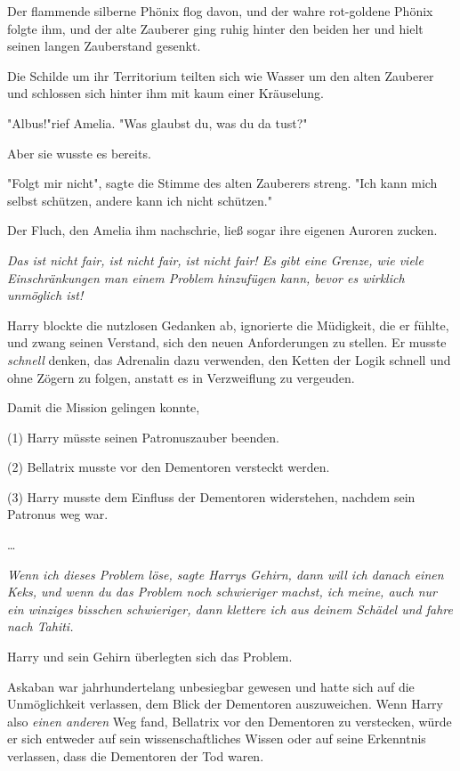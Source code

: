 {Der flammende silberne Phönix flog davon, und der wahre rot-goldene Phönix folgte ihm, und der alte Zauberer ging ruhig hinter den beiden her und hielt seinen langen Zauberstand gesenkt.

Die Schilde um ihr Territorium teilten sich wie Wasser um den alten Zauberer und schlossen sich hinter ihm mit kaum einer Kräuselung.

"Albus!"rief Amelia. "Was glaubst du, was du da tust?"

Aber sie wusste es bereits.

"Folgt mir nicht", sagte die Stimme des alten Zauberers streng. "Ich kann mich selbst schützen, andere kann ich nicht schützen."

Der Fluch, den Amelia ihm nachschrie, ließ sogar ihre eigenen Auroren zucken.

\emph{\emph{Das ist nicht fair, ist nicht fair, ist nicht fair! Es gibt eine Grenze, wie viele Einschränkungen man einem Problem hinzufügen kann, bevor es wirklich unmöglich ist!}}

Harry blockte die nutzlosen Gedanken ab, ignorierte die Müdigkeit, die er fühlte, und zwang seinen Verstand, sich den neuen Anforderungen zu stellen. Er musste \emph{schnell} denken, das Adrenalin dazu verwenden, den Ketten der Logik schnell und ohne Zögern zu folgen, anstatt es in Verzweiflung zu vergeuden.

Damit die Mission gelingen konnte,

(1) Harry müsste seinen Patronuszauber beenden.

(2) Bellatrix musste vor den Dementoren versteckt werden.

(3) Harry musste dem Einfluss der Dementoren widerstehen, nachdem sein Patronus weg war.

…

\emph{\emph{Wenn ich dieses Problem löse,} sagte Harrys Gehirn, \emph{dann will ich danach einen Keks, und wenn} \emph{du} \emph{das Problem noch schwieriger machst, ich meine, auch nur ein} \emph{winziges} \emph{bisschen schwieriger, dann klettere ich aus} \emph{deinem} \emph{Schädel und fahre nach Tahiti.}}

Harry und sein Gehirn überlegten sich das Problem.

Askaban war jahrhundertelang unbesiegbar gewesen und hatte sich auf die Unmöglichkeit verlassen, dem Blick der Dementoren auszuweichen. Wenn Harry also \emph{einen anderen} Weg fand, Bellatrix vor den Dementoren zu verstecken, würde er sich entweder auf sein wissenschaftliches Wissen oder auf seine Erkenntnis verlassen, dass die Dementoren der Tod waren.

}
